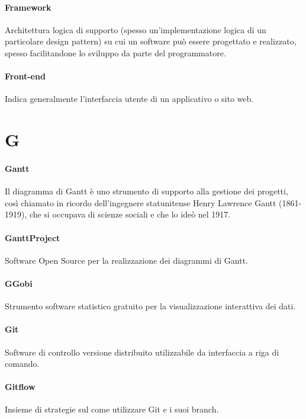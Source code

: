 \documentclass[]{article}
\begin{document}
	\paragraph*{Framework}
	Architettura logica di supporto (spesso un'implementazione logica di un particolare design pattern) su cui un software può essere progettato e realizzato, spesso facilitandone lo sviluppo da parte del programmatore.
	
	\paragraph*{Front-end}
	Indica generalmente l'interfaccia utente di un applicativo o sito web.
	
	\newpage

	\section*{G}
	
	\paragraph*{Gantt}
	Il diagramma di Gantt è uno strumento di supporto alla gestione dei progetti, così chiamato in ricordo dell'ingegnere statunitense Henry Lawrence Gantt (1861-1919), che si occupava di scienze sociali e che lo ideò nel 1917.
	
	\paragraph*{GanttProject}
	Software Open Source per la realizzazione dei diagrammi di Gantt.
	
	\paragraph*{GGobi}
	Strumento software statistico gratuito per la visualizzazione interattiva dei dati.
	
	\paragraph*{Git}
	Software di controllo versione distribuito utilizzabile da interfaccia a riga di comando.
	
	\paragraph*{Gitflow}
	Insieme di strategie sul come utilizzare Git e i suoi branch.
	
\end{document}
